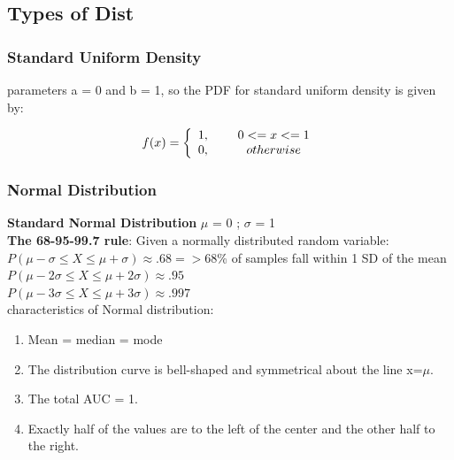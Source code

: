 \documentclass{beamer}
\begin{document}


\subsection{Types of Dist}
\begin{frame}\frametitle{Standard Uniform Density}
parameters a = 0 and b = 1, so the PDF for standard uniform density is given by:

\begin{align}
f(x) = \left\{ \begin{array}{cc} 
1, & \hspace{5mm} 0 <= x <=1 \\
0, & \hspace{5mm} otherwise \\
\end{array} \right.
\end{align}

\end{frame}


\begin{frame}\frametitle{Normal Distribution}
\textbf{Standard Normal Distribution} $\mu$ = 0 ; $\sigma$ = 1 \\
\textbf{The 68-95-99.7 rule}: Given a normally distributed random variable:
$P(\mu-\sigma \leq X \leq \mu+\sigma) \approx .68 =>$68\% of samples fall within 1 SD of the mean \\
$P(\mu-2\sigma \leq X \leq \mu+2\sigma) \approx .95$ \\
$P(\mu-3\sigma \leq X \leq \mu+3\sigma) \approx .997$ \\

characteristics of Normal distribution:
\begin{enumerate}
\item Mean = median = mode
\item The distribution curve is bell-shaped and symmetrical about the line x=$\mu$.
\item The total AUC = 1.
\item Exactly half of the values are to the left of the center and the other half to the right.
\end{enumerate}

\end{frame}
\end{document}
